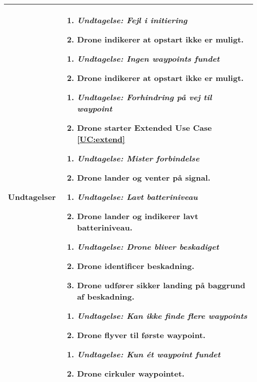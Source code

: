 \documentclass[Main]{subfiles}
\begin{document}
\begin{longtable}{|p{}|p{}|}
Undtagelser & \vspace{-8mm}

	\begin{enumerate}
	\item[] \textit{Undtagelse: Fejl i initiering}
	\item Drone indikerer at opstart ikke er muligt.
	\end{enumerate}


	\begin{enumerate}
	\item[] \textit{Undtagelse: Ingen waypoints fundet}
	\item Drone indikerer at opstart ikke er muligt.
	\end{enumerate}
	
	
	\begin{enumerate}
	\item[] \textit{Undtagelse: Forhindring på vej til waypoint}
	\item Drone starter Extended Use Case \ref{UC:extend}
	\end{enumerate}
	
	
	\begin{enumerate}
	\item[] \textit{Undtagelse: Mister forbindelse}
	\item Drone lander og venter på signal.
	\end{enumerate}


	\begin{enumerate}
	\item[] \textit{Undtagelse: Lavt batteriniveau}
	\item Drone lander og indikerer lavt batteriniveau.
	\end{enumerate}

	
	\begin{enumerate}
	\item[] \textit{Undtagelse: Drone bliver beskadiget}
	\item Drone identificer beskadning.
	\item Drone udfører sikker landing på baggrund af beskadning.
	\end{enumerate}	
	
	
	\begin{enumerate}
	\item[] \textit{Undtagelse: 	Kan ikke finde flere waypoints}
	\item Drone flyver til første waypoint.
	\end{enumerate}	
	
	\begin{enumerate}
	\item[] \textit{Undtagelse: 	Kun ét waypoint fundet}
	\item Drone cirkuler waypointet.
	\end{enumerate}	 \\

\hline
\end{longtable}
\end{document}
